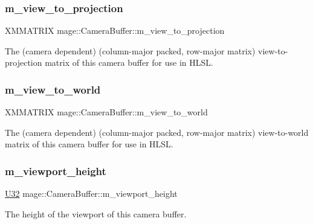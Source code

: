 \subsubsection{\texorpdfstring{m\+\_\+view\+\_\+to\+\_\+projection}{m\_view\_to\_projection}}
{\footnotesize\ttfamily X\+M\+M\+A\+T\+R\+IX mage\+::\+Camera\+Buffer\+::m\+\_\+view\+\_\+to\+\_\+projection}

The (camera dependent) (column-\/major packed, row-\/major matrix) view-\/to-\/projection matrix of this camera buffer for use in H\+L\+SL. \hypertarget{structmage_1_1_camera_buffer_a2c06f8a346844fb99fadb43d128f9d72}{}\label{structmage_1_1_camera_buffer_a2c06f8a346844fb99fadb43d128f9d72} 
\subsubsection{\texorpdfstring{m\+\_\+view\+\_\+to\+\_\+world}{m\_view\_to\_world}}
{\footnotesize\ttfamily X\+M\+M\+A\+T\+R\+IX mage\+::\+Camera\+Buffer\+::m\+\_\+view\+\_\+to\+\_\+world}

The (camera dependent) (column-\/major packed, row-\/major matrix) view-\/to-\/world matrix of this camera buffer for use in H\+L\+SL. \hypertarget{structmage_1_1_camera_buffer_a125fd91de1c41cc5bd1a741295bf0536}{}\label{structmage_1_1_camera_buffer_a125fd91de1c41cc5bd1a741295bf0536} 
\subsubsection{\texorpdfstring{m\+\_\+viewport\+\_\+height}{m\_viewport\_height}}
{\footnotesize\ttfamily \hyperlink{namespacemage_a41c104c036fba3756a74e19f793eeaa1}{U32} mage\+::\+Camera\+Buffer\+::m\+\_\+viewport\+\_\+height}

The height of the viewport of this camera buffer. \hypertarget{structmage_1_1_camera_buffer_ad347cafbbd512bda9324033d08315846}{}\label{structmage_1_1_camera_buffer_ad347cafbbd512bda9324033d08315846} 
